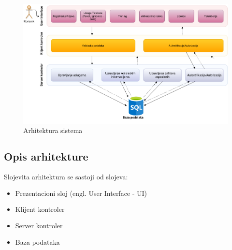 \documentclass[../main.tex]{subfiles}
\begin{document}
\begin{figure}[!ht]
\begin{center}
\includegraphics[width=\textwidth]{sections/images/arhitektura_sistema.png}
\end{center}
\caption{Arhitektura sistema}
\label{fig:kontekst}
\end{figure}

\subsection{Opis arhitekture}
Slojevita arhitektura se sastoji od slojeva: 
\begin{itemize}
    \item Prezentacioni sloj (engl. User Interface - UI)
    \item Klijent kontroler
    \item Server kontroler
    \item Baza podataka
\end{itemize}
\end{document}
